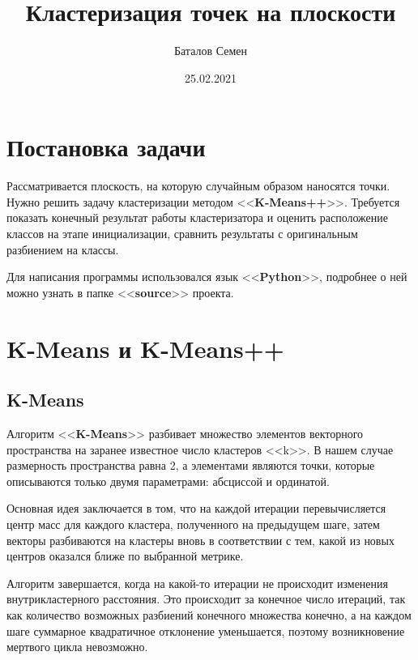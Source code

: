 \documentclass[12pt, a4paper]{article}
\title{Кластеризация точек на плоскости}
\author{Баталов Семен}
\date{25.02.2021}
\begin{document}
    
    \sloppy
    
    \maketitle
    
    \section{Постановка задачи}
    
    Рассматривается плоскость, на которую случайным образом наносятся точки. 
    Нужно решить задачу кластеризации методом <<\textbf{K-Means++}>>. 
    Требуется показать конечный результат работы кластеризатора и оценить 
    расположение классов на этапе инициализации, сравнить результаты с 
    оригинальным разбиением на классы.
    
    Для написания программы использовался язык <<\textbf{Python}>>, подробнее 
    о ней можно узнать в папке <<\textbf{source}>> проекта.
    
    \section{K-Means и K-Means++}
    
    \subsection{K-Means}
    
    Алгоритм <<\textbf{K-Means}>> разбивает множество элементов векторного 
    пространства на заранее известное число кластеров <<k>>. В нашем случае 
    размерность пространства равна 2, а элементами являются точки, которые 
    описываются только двумя параметрами: абсциссой и ординатой.
    
    Основная идея заключается в том, что на каждой итерации перевычисляется 
    центр масс для каждого кластера, полученного на предыдущем шаге, затем 
    векторы разбиваются на кластеры вновь в соответствии с тем, какой из 
    новых центров оказался ближе по выбранной метрике.
    
    Алгоритм завершается, когда на какой-то итерации не происходит изменения 
    внутрикластерного расстояния. Это происходит за конечное число итераций, 
    так как количество возможных разбиений конечного множества конечно, а на 
    каждом шаге суммарное квадратичное отклонение уменьшается, поэтому 
    возникновение мертвого цикла невозможно.
    
\end{document}
